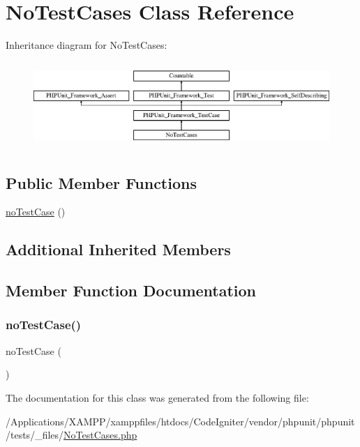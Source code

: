 \hypertarget{class_no_test_cases}{}\section{No\+Test\+Cases Class Reference}
\label{class_no_test_cases}
Inheritance diagram for No\+Test\+Cases\+:\begin{figure}[H]
\begin{center}
\leavevmode
\includegraphics[height=3.303835cm]{class_no_test_cases}
\end{center}
\end{figure}
\subsection*{Public Member Functions}
\begin{DoxyCompactItemize}
\item 
\mbox{\hyperlink{class_no_test_cases_aa65ee00540e2674f18afc5a43359fa08}{no\+Test\+Case}} ()
\end{DoxyCompactItemize}
\subsection*{Additional Inherited Members}


\subsection{Member Function Documentation}
\mbox{\label{class_no_test_cases_aa65ee00540e2674f18afc5a43359fa08}} 
\subsubsection{\texorpdfstring{no\+Test\+Case()}{noTestCase()}}
{\footnotesize\ttfamily no\+Test\+Case (\begin{DoxyParamCaption}{ }\end{DoxyParamCaption})}



The documentation for this class was generated from the following file\+:\begin{DoxyCompactItemize}
\item 
/\+Applications/\+X\+A\+M\+P\+P/xamppfiles/htdocs/\+Code\+Igniter/vendor/phpunit/phpunit/tests/\+\_\+files/\mbox{\hyperlink{_no_test_cases_8php}{No\+Test\+Cases.\+php}}\end{DoxyCompactItemize}
